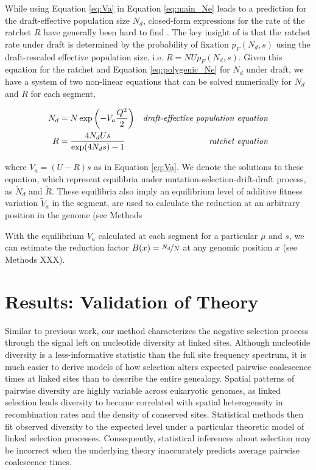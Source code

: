 \documentclass[11pt]{article}
\begin{document}
While using Equation \eqref{eq:Va} in Equation \eqref{eq:main_Ne} leads to a
prediction for the draft-effective population size $N_d$, closed-form
expressions for the rate of the ratchet $R$ have generally been hard to find
\parencite{Haigh1978-gt,Higgs1995-xc,Gessler1995-hz}. The key insight of
\textcite{Santiago2016-mu} is that the ratchet rate under draft is determined
by the probability of fixation $p_F(N_d, s)$
\parencite{Kimura1962-su,Malecot1952-qh} using the draft-rescaled effective
population size, i.e. $R = N U p_F(N_d, s)$. Given this equation for the
ratchet and Equation \eqref{eq:polygenic_Ne} for $N_d$ under draft, we have a
system of two non-linear equations that can be solved numerically for $N_d$ and
$R$ for each segment,

\begin{align}
  \label{eq:main_eqns}
  N_d &= N \exp \left( -V_a \frac{Q^2}{2} \right) & \text{\emph{draft-effective population equation}} \\
  R &= \frac{4N_d U s}{\exp(4 N_d s)-1}  & \text{\emph{ratchet equation}}
\end{align}

where $V_a = (U-R)s$ as in Equation \eqref{eq:Va}. We denote the solutions to
these equation, which represent equilibria under mutation-selection-drift-draft
process, as $\widetilde{N}_d$ and $\widetilde{R}$. These equilibria also imply
an equilibrium level of additive fitness variation $\widetilde{V}_a$ in the
segment, are used to calculate the reduction at an arbitrary position in the
genome (see Methods 

With the equilibrium $V_a$ calculated at each segment for a particular $\mu$
and $s$, we can estimate the reduction factor $B(x) = \nicefrac{N_d}{N}$ at any
genomic position $x$ (see Methods XXX).

\section*{Results: Validation of Theory}

Similar to previous work, our method characterizes the negative selection
process through the signal left on nucleotide diversity at linked sites.
Although nucleotide diversity is a less-informative statistic than the full
site frequency spectrum, it is much easier to derive models of how selection
alters expected pairwise coalescence times at linked sites than to describe the
entire genealogy. Spatial patterns of pairwise diversity are highly variable
across eukaryotic genomes, as linked selection leads diversity to become
correlated with spatial heterogeneity in recombination rates and the density of
conserved sites. Statistical methods then fit observed diversity to the
expected level under a particular theoretic model of linked selection
processes. Consequently, statistical inferences about selection may be
incorrect when the underlying theory inaccurately predicts average pairwise
coalescence times.
\end{document}
